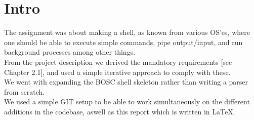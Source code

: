 \chapter{Intro}
The assignment was about making a shell, as known from various OS'es, where one should be able to execute simple commands, pipe output/input, and run background processes among other things.\\

From the project description we derived the mandatory requirements [see Chapter 2.1], and used a simple iterative approach to comply with these.\\

We went with expanding the BOSC shell skeleton rather than writing a parser from scratch.\\

We used a simple GIT setup to be able to work simultaneously on the different additions in the codebase, aswell as this report which is written in LaTeX.

